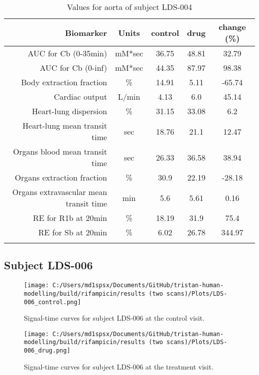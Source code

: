 \documentclass{epflreport}%
\begin{document}
\begin{longtable}{rcccc}%
\hline%
Biomarker&Units&control&drug&change (\%)\\%
\hline%
AUC for Cb (0{-}35min)&mM*sec&36.75&48.81&32.79\\%
AUC for Cb (0{-}inf)&mM*sec&44.35&87.97&98.38\\%
Body extraction fraction&\%&14.91&5.11&{-}65.74\\%
Cardiac output&L/min&4.13&6.0&45.14\\%
Heart{-}lung dispersion&\%&31.15&33.08&6.2\\%
Heart{-}lung mean transit time&sec&18.76&21.1&12.47\\%
Organs blood mean transit time&sec&26.33&36.58&38.94\\%
Organs extraction fraction&\%&30.9&22.19&{-}28.18\\%
Organs extravascular mean transit time&min&5.6&5.61&0.16\\%
RE for R1b at 20min&\%&18.19&31.9&75.4\\%
RE for Sb at 20min&\%&6.02&26.78&344.97\\%
\hline%
\caption{Values for aorta of subject LDS-004} \\%
\end{longtable}%
\clearpage%
\subsection{Subject LDS{-}006}%
\label{subsec:SubjectLDS{-}006}%

%


\begin{figure}[h!]%
\centering%
\texttt{[image: C:/Users/md1spsx/Documents/GitHub/tristan-human-modelling/build/rifampicin/results (two scans)/Plots/LDS-006\_control.png]}%
\caption{Signal{-}time curves for subject LDS{-}006 at the control visit.}%
\end{figure}

%


\begin{figure}[h!]%
\centering%
\texttt{[image: C:/Users/md1spsx/Documents/GitHub/tristan-human-modelling/build/rifampicin/results (two scans)/Plots/LDS-006\_drug.png]}%
\caption{Signal{-}time curves for subject LDS{-}006 at the treatment visit.}%
\end{figure}
\end{document}
